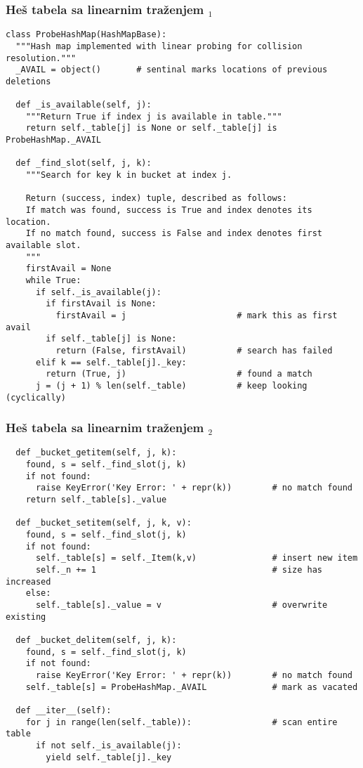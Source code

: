 \documentclass[compress]{beamer}
\begin{document}
\begin{frame}[fragile,shrink=25]
  \frametitle{Heš tabela sa linearnim traženjem $_1$}
\begin{verbatim}
class ProbeHashMap(HashMapBase):
  """Hash map implemented with linear probing for collision resolution."""
  _AVAIL = object()       # sentinal marks locations of previous deletions

  def _is_available(self, j):
    """Return True if index j is available in table."""
    return self._table[j] is None or self._table[j] is ProbeHashMap._AVAIL

  def _find_slot(self, j, k):
    """Search for key k in bucket at index j.

    Return (success, index) tuple, described as follows:
    If match was found, success is True and index denotes its location.
    If no match found, success is False and index denotes first available slot.
    """
    firstAvail = None
    while True:                               
      if self._is_available(j):
        if firstAvail is None:
          firstAvail = j                      # mark this as first avail
        if self._table[j] is None:
          return (False, firstAvail)          # search has failed
      elif k == self._table[j]._key:
        return (True, j)                      # found a match
      j = (j + 1) % len(self._table)          # keep looking (cyclically)
\end{verbatim}
\end{frame}

\begin{frame}[fragile,shrink=25]
  \frametitle{Heš tabela sa linearnim traženjem $_2$}
\begin{verbatim}
  def _bucket_getitem(self, j, k):
    found, s = self._find_slot(j, k)
    if not found:
      raise KeyError('Key Error: ' + repr(k))        # no match found
    return self._table[s]._value

  def _bucket_setitem(self, j, k, v):
    found, s = self._find_slot(j, k)
    if not found:
      self._table[s] = self._Item(k,v)               # insert new item
      self._n += 1                                   # size has increased
    else:
      self._table[s]._value = v                      # overwrite existing

  def _bucket_delitem(self, j, k):
    found, s = self._find_slot(j, k)
    if not found:
      raise KeyError('Key Error: ' + repr(k))        # no match found
    self._table[s] = ProbeHashMap._AVAIL             # mark as vacated

  def __iter__(self):
    for j in range(len(self._table)):                # scan entire table
      if not self._is_available(j):
        yield self._table[j]._key
\end{verbatim}
\end{frame}
\end{document}
